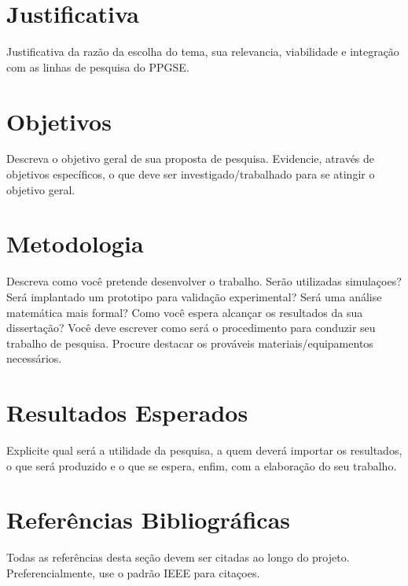 \documentclass[a4paper,12pt]{article}
\begin{document}
\section{Justificativa}
Justificativa da razão da escolha do tema, sua relevancia, viabilidade e integração com as linhas de pesquisa do PPGSE.



\section{Objetivos}
Descreva o objetivo geral de sua proposta de pesquisa. Evidencie, através de objetivos específicos, o que deve ser investigado/trabalhado para se atingir o objetivo geral.


\section{Metodologia}
Descreva como você pretende desenvolver o trabalho. Serão utilizadas simulaçoes? Será implantado um prototipo para validação experimental? Será uma análise matemática mais formal? Como você espera alcançar os resultados da sua dissertação? Você deve escrever como será o procedimento para conduzir seu trabalho de pesquisa. Procure destacar os prováveis materiais/equipamentos necessários.


\section{Resultados Esperados}
Explicite qual será a utilidade da pesquisa, a quem deverá importar os resultados, o que será produzido e o que se espera, enfim, com a elaboração do seu trabalho. 


\section*{Referências Bibliográficas}
Todas as referências desta seção devem ser citadas ao longo do projeto. Preferencialmente, use o padrão IEEE para citaçoes.


%
%
\end{document}
